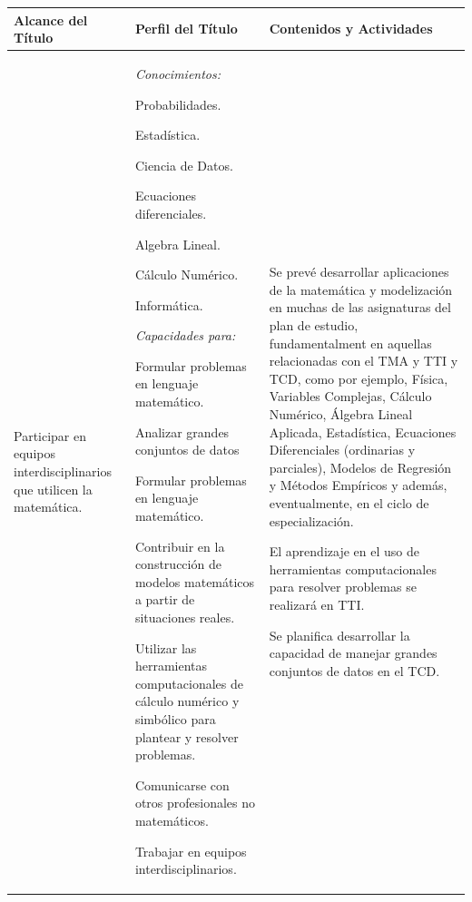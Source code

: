 \documentclass[a4paper, 12pt]{article}
\begin{document}
\begin{center}

\begin{tabularx}{1.0\textwidth}{|>{\raggedright\arraybackslash}X |
>{\raggedright\arraybackslash}X |
>{\raggedright\arraybackslash}X |
}\hline
  \rowcolor[gray]{.9}
  Alcance del Título
  & Perfil del Título
  & Contenidos y Actividades \\ \hline
Participar en equipos interdisciplinarios que utilicen la matemática.
  & \emph{Conocimientos:} 
  
 
 Probabilidades.
    
   Estadística.
   
   Ciencia de Datos.
   
   Ecuaciones diferenciales.
   
   Algebra Lineal. 
   
   Cálculo Numérico. 
   
   Informática.
 
  
  \emph{Capacidades para:} 
    
 
   Formular problemas en lenguaje matemático.
   
    Analizar grandes conjuntos de datos
    
   Formular problemas en lenguaje matemático.
   
   Contribuir en la construcción de modelos matemáticos a partir de situaciones reales.
   
    Utilizar las herramientas computacionales de cálculo numérico y simbólico para plantear y resolver problemas.
    
   Comunicarse con otros profesionales no matemáticos.
   
   Trabajar en equipos interdisciplinarios.
 
  
  
  &

  
 Se prevé desarrollar aplicaciones de la matemática y modelización en muchas de las asignaturas del plan de estudio, fundamentalment en aquellas relacionadas con el TMA y TTI y TCD, como por ejemplo,  Física, Variables Complejas, Cálculo Numérico, Álgebra Lineal Aplicada, Estadística, Ecuaciones Diferenciales (ordinarias y parciales), Modelos de Regresión y Métodos Empíricos y además, eventualmente, en el ciclo de especialización.
  
  El aprendizaje en el uso de herramientas computacionales para resolver problemas se realizará en  TTI.
  
  Se planifica desarrollar la capacidad de manejar grandes conjuntos de datos en el TCD.



\end{tabularx}
\end{center}
\end{document}
